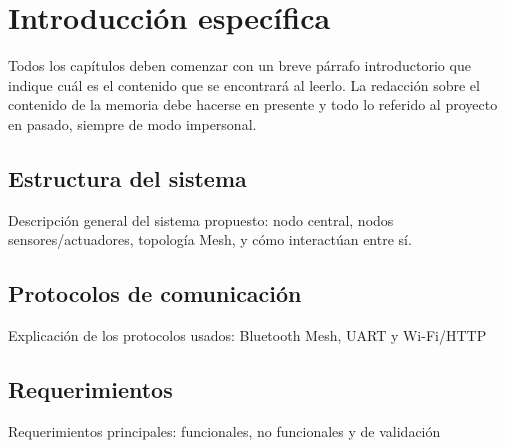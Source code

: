 \chapter{Introducción específica} %

\label{Chapter2}

Todos los capítulos deben comenzar con un breve párrafo introductorio que indique cuál es el contenido que se encontrará al leerlo.  La redacción sobre el contenido de la memoria debe hacerse en presente y todo lo referido al proyecto en pasado, siempre de modo impersonal.

\section{Estructura del sistema}
\label{sec:ejemplo}

Descripción general del sistema propuesto: nodo central, nodos sensores/actuadores, topología Mesh, y cómo interactúan entre sí.


\section{Protocolos de comunicación}
Explicación de los protocolos usados: Bluetooth Mesh, UART y Wi-Fi/HTTP

\section{Requerimientos}
Requerimientos principales: funcionales, no funcionales y de validación